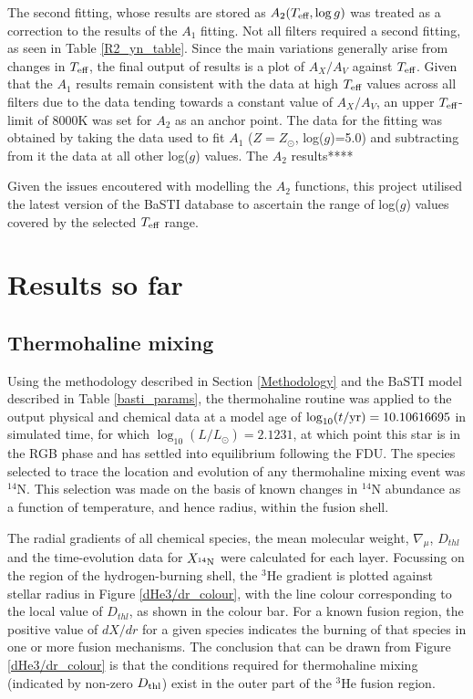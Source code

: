 \documentclass[12pt, a4paper]{report}
\begin{document}
The second fitting, whose results are stored as $A_{2}(T_{\textnormal{eff}},\log{g})$ was treated as a correction to the results of the $A_{1}$ fitting. Not all filters required a second fitting, as seen in Table \ref{R2_yn_table}. Since the main variations generally arise from changes in $T_{\textnormal{eff}}$, the final output of results is a plot of $A_{X}/A_{V}$ against $T_{\textnormal{eff}}$. Given that the $A_{1}$ results remain consistent with the data at high $T_{\textnormal{eff}}$ values across all filters due to the data tending towards a constant value of $A_{X}/A_{V}$, an upper $T_{\textnormal{eff}}$-limit of 8000K was set for $A_{2}$ as an anchor point. The data for the fitting was obtained by taking the data used to fit $A_{1}$ ($Z = Z_{\odot}$, log($g$)=5.0) and subtracting from it the data at all other log($g$) values. The $A_{2}$ results****

Given the issues encoutered with modelling the $A_{2}$ functions, this project utilised the latest version of the BaSTI database \citep{2018ApJ...856..125H} to ascertain the range of log($g$) values covered by the selected $T_{\textnormal{eff}}$ range.

\chapter{Results so far}
\section{Thermohaline mixing}
Using the methodology described in Section \ref{Methodology} and the BaSTI model described in Table \ref{basti_params}, the thermohaline routine was applied to the output physical and chemical data at a model age of $\log_{10}(t/\textnormal{yr}) = 10.10616695$ in simulated time, for which $\log_{10}(L/L_{\odot}) = 2.1231$, at which point this star is in the RGB phase and has settled into equilibrium following the FDU. The species selected to trace the location and evolution of any thermohaline mixing event was $^{14}$N. This selection was made on the basis of known changes in $^{14}$N abundance as a function of temperature, and hence radius, within the fusion shell.

The radial gradients of all chemical species, the mean molecular weight, $\nabla_{\mu}$,  $D_{thl}$ and the time-evolution data for $X_{^{14}\textnormal{N}}$ were calculated for each layer. Focussing on the region of the hydrogen-burning shell, the $^{3}$He gradient is plotted against stellar radius in Figure \ref{dHe3/dr_colour}, with the line colour corresponding to the local value of $D_{thl}$, as shown in the colour bar. For a known fusion region, the positive value of $dX/dr$ for a given species indicates the burning of that species in one or more fusion mechanisms. The conclusion that can be drawn from Figure \ref{dHe3/dr_colour} is that the conditions required for thermohaline mixing (indicated by non-zero $D_{\textnormal{thl}}$) exist in the outer part of the $^{3}$He fusion region.
\end{document}
